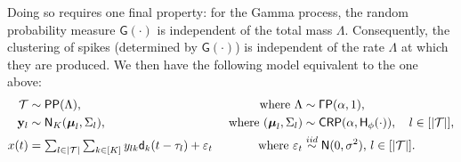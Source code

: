 Doing so requires one final property: for the Gamma process, the random probability measure $\mathsf{G}(\cdot)$ is independent of the total mass $\Lambda$. 
Consequently, the clustering of spikes (determined by $\mathsf{G}(\cdot)$) is independent of the rate $\Lambda$ at which they are produced. We then have
 the following model equivalent to the one above:
\begin{subequations}
\begin{align}
  \mathcal{T} &\sim \mathsf{PP}(\Lambda), \qquad &\text{ where } \Lambda  &\sim \mathsf{\Gamma P}(\alpha, 1),
   \\
  \mathbf{y}_l &\sim \mathsf{N}_K(\boldsymbol{\mu}_{l}, \Sigma_{l}), \qquad &\text{ where } (\boldsymbol{\mu}_{l}, \Sigma_{l})  &\sim {\mathsf{CRP}}(\alpha, \mathsf{H}_{\phi}(\cdot)), \quad  l \in [|\mathcal{T}|],   \label{eq:CRP}\\
  x(t) &=   \textstyle{\sum_{l \in |\mathcal{T}|}} \sum_{k \in [K]} y_{lk} \mathsf{d}_k(t - \tau_{l}) + \varepsilon_t  &\text{ where }  \varepsilon_t &\overset{iid}{\sim} \mathsf{N}(0,\sigma^2),  \,  l \in [|\mathcal{T}|].   \label{eq:CRP_mix}
\end{align} \label{eq:marked_pp}
\end{subequations}


